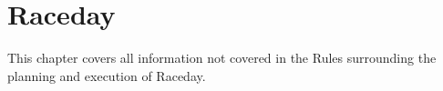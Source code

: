 \chapter{Raceday}
This chapter covers all information not covered in the Rules surrounding
the planning and execution of Raceday.
